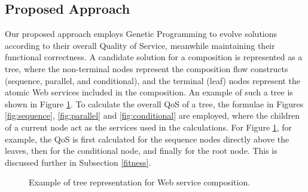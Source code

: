 \subsection{Proposed Approach}
Our proposed approach employs Genetic Programming to evolve solutions according to their overall Quality of Service, meanwhile maintaining their functional correctness. A candidate solution for a composition is represented as a tree, where the non-terminal nodes represent the composition flow constructs (sequence, parallel, and conditional), and the terminal (leaf) nodes represent the atomic Web services included in the composition. An example of such a tree is shown in Figure \ref{fig:tree}. To calculate the overall QoS of a tree, the formulae in Figures \ref{fig:sequence}, \ref{fig:parallel} and \ref{fig:conditional} are employed, where the children of a current node act as the services used in the calculations. For Figure \ref{fig:tree}, for example, the QoS is first calculated for the sequence nodes directly above the leaves, then for the conditional node, and finally for the root node. This is discussed further in Subsection \ref{fitness}.

\begin{figure}
\centerline{
}
\caption{Example of tree representation for Web service composition.}
\label{fig:tree}
\end{figure}

